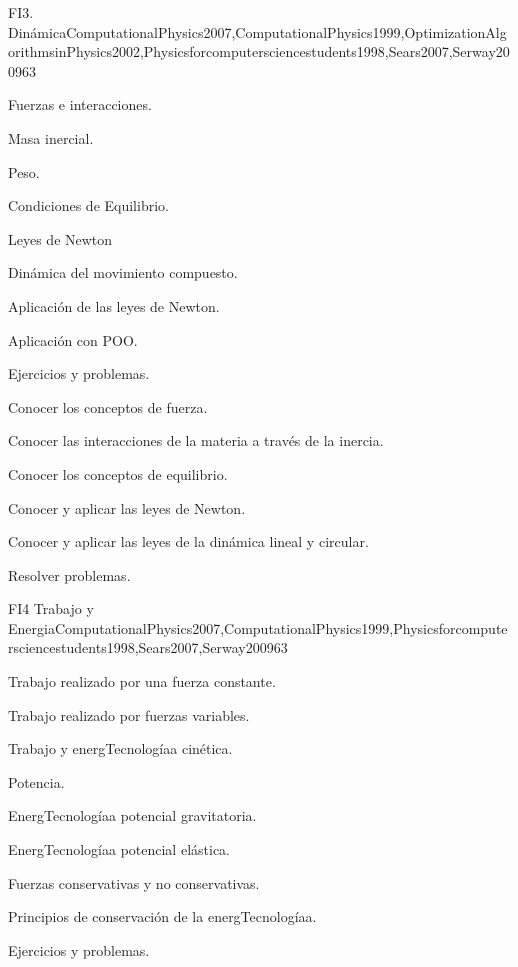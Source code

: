 \begin{syllabus}
\begin{unit}{FI3. Dinámica}{ComputationalPhysics2007,ComputationalPhysics1999,OptimizationAlgorithmsinPhysics2002,Physicsforcomputersciencestudents1998,Sears2007,Serway2009}{6}{3}
\begin{topics}
      \item Fuerzas e interacciones.
      \item Masa inercial.
      \item Peso.
      \item Condiciones de Equilibrio.
      \item Leyes de Newton
      \item Dinámica del movimiento compuesto.
      \item Aplicación de las leyes de Newton.
      \item Aplicación con POO.
      \item Ejercicios y problemas.
   \end{topics}

   \begin{unitgoals}
      \item Conocer los conceptos de fuerza.
      \item Conocer las interacciones de la materia a través de la inercia.
      \item Conocer los conceptos de equilibrio.
      \item Conocer y aplicar las leyes de Newton.      
      \item Conocer y aplicar las leyes de la dinámica lineal y circular.
      \item Resolver problemas.
   \end{unitgoals}
\end{unit}

\begin{unit}{FI4 Trabajo y Energia}{ComputationalPhysics2007,ComputationalPhysics1999,Physicsforcomputersciencestudents1998,Sears2007,Serway2009}{6}{3}
\begin{topics}
      \item Trabajo realizado por una fuerza constante.
      \item Trabajo realizado por fuerzas variables.
      \item Trabajo y energTecnologíaa cinética.
      \item Potencia.
      \item EnergTecnologíaa potencial gravitatoria.
      \item EnergTecnologíaa potencial elástica.
      \item Fuerzas conservativas y no conservativas.
      \item Principios de conservación de la energTecnologíaa.
      \item Ejercicios y problemas.
   \end{topics}


\end{unit}
\end{syllabus}
